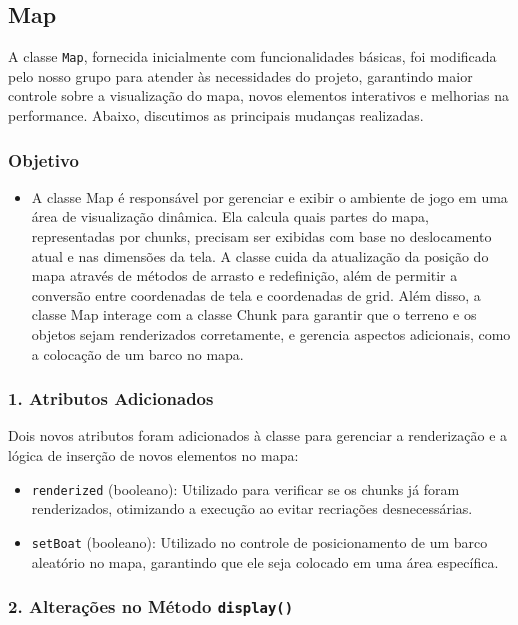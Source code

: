 \documentclass[
	12pt,				%
	oneside,			%
	a4paper,			%
	english,			%
	brazil,				%
	]{abntex2}
\begin{document}
{\subsection{Map}

A classe \texttt{Map}, fornecida inicialmente com funcionalidades básicas, foi modificada pelo nosso grupo para atender às necessidades do projeto, garantindo maior controle sobre a visualização do mapa, novos elementos interativos e melhorias na performance. Abaixo, discutimos as principais mudanças realizadas.

\subsubsection{Objetivo}
\begin{itemize}
    \item A classe Map é responsável por gerenciar e exibir o ambiente de jogo em uma área de visualização dinâmica. Ela calcula quais partes do mapa, representadas por chunks, precisam ser exibidas com base no deslocamento atual e nas dimensões da tela. A classe cuida da atualização da posição do mapa através de métodos de arrasto e redefinição, além de permitir a conversão entre coordenadas de tela e coordenadas de grid. Além disso, a classe Map interage com a classe Chunk para garantir que o terreno e os objetos sejam renderizados corretamente, e gerencia aspectos adicionais, como a colocação de um barco no mapa.


\end{itemize}

\subsubsection{1. Atributos Adicionados}

Dois novos atributos foram adicionados à classe para gerenciar a renderização e a lógica de inserção de novos elementos no mapa:

\begin{itemize}
    \item \texttt{renderized} (booleano): Utilizado para verificar se os chunks já foram renderizados, otimizando a execução ao evitar recriações desnecessárias.
    \item \texttt{setBoat} (booleano): Utilizado no controle de posicionamento de um barco aleatório no mapa, garantindo que ele seja colocado em uma área específica.
\end{itemize}

\subsubsection{2. Alterações no Método \texttt{display()}}

}
\end{document}
